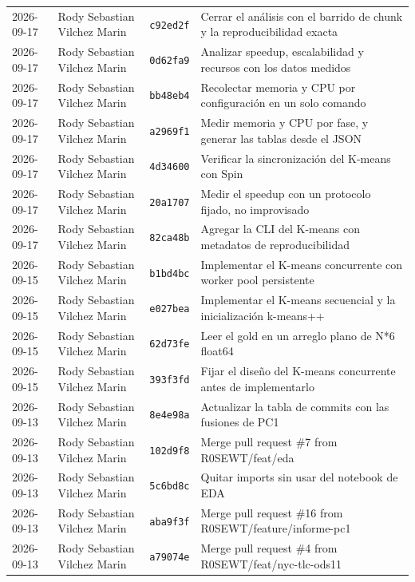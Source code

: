 {\begin{xltabular}{\textwidth}{@{}L{2cm}L{2.9cm}L{1.5cm}Y@{}}
2026-09-17 & Rody Sebastian Vilchez Marin & \texttt{c92ed2f} & Cerrar el análisis con el barrido de chunk y la reproducibilidad exacta \\
2026-09-17 & Rody Sebastian Vilchez Marin & \texttt{0d62fa9} & Analizar speedup, escalabilidad y recursos con los datos medidos \\
2026-09-17 & Rody Sebastian Vilchez Marin & \texttt{bb48eb4} & Recolectar memoria y CPU por configuración en un solo comando \\
2026-09-17 & Rody Sebastian Vilchez Marin & \texttt{a2969f1} & Medir memoria y CPU por fase, y generar las tablas desde el JSON \\
2026-09-17 & Rody Sebastian Vilchez Marin & \texttt{4d34600} & Verificar la sincronización del K-means con Spin \\
2026-09-17 & Rody Sebastian Vilchez Marin & \texttt{20a1707} & Medir el speedup con un protocolo fijado, no improvisado \\
2026-09-17 & Rody Sebastian Vilchez Marin & \texttt{82ca48b} & Agregar la CLI del K-means con metadatos de reproducibilidad \\
2026-09-15 & Rody Sebastian Vilchez Marin & \texttt{b1bd4bc} & Implementar el K-means concurrente con worker pool persistente \\
2026-09-15 & Rody Sebastian Vilchez Marin & \texttt{e027bea} & Implementar el K-means secuencial y la inicialización k-means++ \\
2026-09-15 & Rody Sebastian Vilchez Marin & \texttt{62d73fe} & Leer el gold en un arreglo plano de N*6 float64 \\
2026-09-15 & Rody Sebastian Vilchez Marin & \texttt{393f3fd} & Fijar el diseño del K-means concurrente antes de implementarlo \\
2026-09-13 & Rody Sebastian Vilchez Marin & \texttt{8e4e98a} & Actualizar la tabla de commits con las fusiones de PC1 \\
2026-09-13 & Rody Sebastian Vilchez Marin & \texttt{102d9f8} & Merge pull request \#7 from R0SEWT/feat/eda \\
2026-09-13 & Rody Sebastian Vilchez Marin & \texttt{5c6bd8c} & Quitar imports sin usar del notebook de EDA \\
2026-09-13 & Rody Sebastian Vilchez Marin & \texttt{aba9f3f} & Merge pull request \#16 from R0SEWT/feature/informe-pc1 \\
2026-09-13 & Rody Sebastian Vilchez Marin & \texttt{a79074e} & Merge pull request \#4 from R0SEWT/feat/nyc-tlc-ods11 \\

\end{xltabular}}

